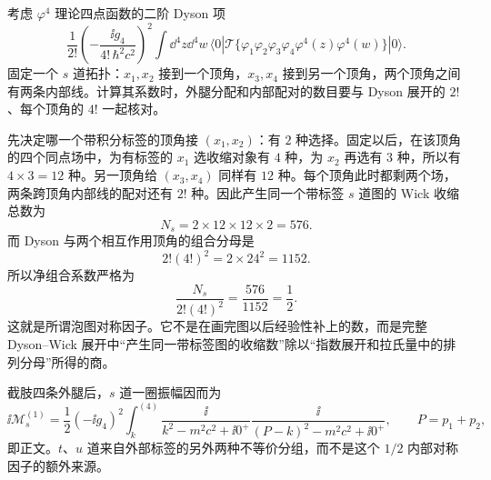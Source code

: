 \begin{derivation}[四点泡图的对称因子]
考虑 $\varphi^4$ 理论四点函数的二阶 Dyson 项
\begin{equation*}
 \frac{1}{2!}
 \left(-\frac{\ii g_4}{4!\,\hbar^2c^2}\right)^2
 \int\dd^4z\dd^4w\,
 \langle0|\mathcal T\{
 \varphi_1\varphi_2\varphi_3\varphi_4
 \varphi^4(z)\varphi^4(w)\}|0\rangle .
\end{equation*}
固定一个 $s$ 道拓扑：$x_1,x_2$ 接到一个顶角，$x_3,x_4$ 接到另一个顶角，两个顶角之间有两条内部线。计算其系数时，外腿分配和内部配对的数目要与 Dyson 展开的 $2!$、每个顶角的 $4!$ 一起核对。

先决定哪一个带积分标签的顶角接 $(x_1,x_2)$：有 $2$ 种选择。固定以后，在该顶角的四个同点场中，为有标签的 $x_1$ 选收缩对象有 $4$ 种，为 $x_2$ 再选有 $3$ 种，所以有 $4\times3=12$ 种。另一顶角给 $(x_3,x_4)$ 同样有 $12$ 种。每个顶角此时都剩两个场，两条跨顶角内部线的配对还有 $2!$ 种。因此产生同一个带标签 $s$ 道图的 Wick 收缩总数为
\begin{equation*}
 N_s=2\times12\times12\times2=576.
\end{equation*}
而 Dyson 与两个相互作用顶角的组合分母是
\begin{equation*}
 2!(4!)^2=2\times24^2=1152.
\end{equation*}
所以净组合系数严格为
\begin{equation*}
 \frac{N_s}{2!(4!)^2}=\frac{576}{1152}=\frac12.
\end{equation*}
这就是所谓泡图对称因子。它不是在画完图以后经验性补上的数，而是完整 Dyson--Wick 展开中“产生同一带标签图的收缩数”除以“指数展开和拉氏量中的排列分母”所得的商。

截肢四条外腿后，$s$ 道一圈振幅因而为
\begin{equation*}
 \ii\mathcal M_s^{(1)}
 =\frac12(-\ii g_4)^2
 \int_k^{(4)}
 \frac{\ii}{k^2-m^2c^2+\ii0^+}
 \frac{\ii}{(P-k)^2-m^2c^2+\ii0^+},
 \qquad P=p_1+p_2,
\end{equation*}
即正文。$t$、$u$ 道来自外部标签的另外两种不等价分组，而不是这个 $1/2$ 内部对称因子的额外来源。
\end{derivation}

